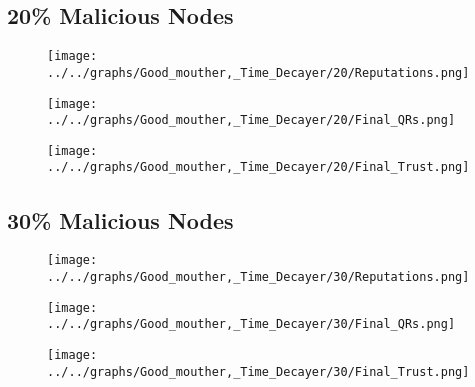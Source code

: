 \begin{minipage}[t]{0.49\columnwidth}
\subsection*{20\% Malicious Nodes}
    \begin{figure}[H]
        \centering
        \texttt{[image: ../../graphs/Good\_mouther,\_Time\_Decayer/20/Reputations.png]}
    \end{figure}
    \begin{figure}[H]
        \centering
        \texttt{[image: ../../graphs/Good\_mouther,\_Time\_Decayer/20/Final\_QRs.png]}
    \end{figure}
\end{minipage}
\begin{minipage}[t]{0.49\columnwidth}
    \begin{figure}[H]
        \centering
        \texttt{[image: ../../graphs/Good\_mouther,\_Time\_Decayer/20/Final\_Trust.png]}
    \end{figure}
\end{minipage}

\begin{minipage}[t]{0.49\columnwidth}
\subsection*{30\% Malicious Nodes}
    \begin{figure}[H]
        \centering
        \texttt{[image: ../../graphs/Good\_mouther,\_Time\_Decayer/30/Reputations.png]}
    \end{figure}
    \begin{figure}[H]
        \centering
        \texttt{[image: ../../graphs/Good\_mouther,\_Time\_Decayer/30/Final\_QRs.png]}
    \end{figure}
\end{minipage}
\begin{minipage}[t]{0.49\columnwidth}
    \begin{figure}[H]
        \centering
        \texttt{[image: ../../graphs/Good\_mouther,\_Time\_Decayer/30/Final\_Trust.png]}
    \end{figure}
\end{minipage}

